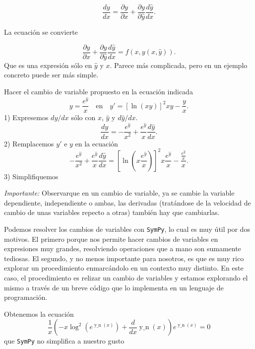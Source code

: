 \[\frac{dy}{dx}=\frac{\partial y}{\partial x}+\frac{\partial y}{\partial \hat{y}}\frac{d\hat{y}}{dx}.\]

La ecuación se convierte

\[\frac{\partial y}{\partial x}+\frac{\partial y}{\partial \hat{y}}\frac{d\hat{y}}{dx}=f(x,y(x,\hat{y})).\]
Que es una expresión sólo en $\hat{y}$ y $x$. Parece más complicada, pero en un ejemplo concreto puede ser más simple.







\begin{ejemplo} Hacer el cambio de variable propuesto en la  ecuación indicada
\[y=\frac{e^{\hat{y}}}{x}\quad\text{en}\quad  y'=\left[\ln(xy)\right]^2xy-\frac{y}{x}.\]
 1) Expresemos $dy/dx$ sólo con $x$, $\hat{y}$ y $d\hat{y}/dx$.
\[\frac{dy}{dx}=-\frac{e^{\hat{y}}}{x^2}+\frac{e^{\hat{y}}}{x}\frac{d\hat{y}}{dx}.\]
 2) Remplacemos $y'$ e $y$ en la ecuación
\[-\frac{e^{\hat{y}}}{x^2}+\frac{e^{\hat{y}}}{x}\frac{d\hat{y}}{dx}=\left[\ln\left(x \frac{e^{\hat{y}}}{x} \right)\right]^2x\frac{e^{\hat{y}}}{x}-\frac{\frac{e^{\hat{y}}}{x} }{x}.\]
 3) Simplifiquemos




\end{ejemplo}

\emph{Importante:} Observar\advertencia  que en un cambio de variable, ya se cambie la variable dependiente, independiente o ambas, las derivadas (tratándose de la velocidad de cambio de unas variables repecto a otras)  también hay que cambiarlas.  


Podemos resolver los cambios de variables con \texttt{SymPy}, lo cual es muy útil por dos motivos. El primero porque nos permite hacer cambios de variables en expresiones muy grandes, resolviendo operaciones que a mano son sumamente tediosas. El segundo, y no menos importante para nosotros, es que es muy rico explorar un procedimiento enmarcándolo en un contexto muy distinto. En este caso, el procedimiento es relizar un cambio de variables y estamos explorando el mismo a través de un breve código que lo implementa en un lenguaje de programación.


Obtenemos la ecuación
\[\frac{1}{x} \left(- x \log^{2}{\left (e^{\operatorname{y\_n}{\left (x \right )
}} \right )} + \frac{d}{d x} \operatorname{y\_n}{\left (x \right )}\right) e^{
\operatorname{y\_n}{\left (x \right )}} = 0\]
que \texttt{SymPy} no simplifica a nuestro gusto




